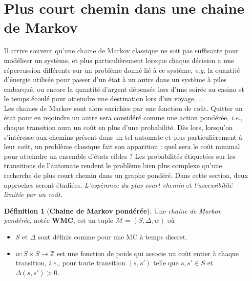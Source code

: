 \documentclass[12pt,a4paper]{report}
\theoremstyle{definition}
\newtheorem{definition}{Définition}[chapter]
\theoremstyle{remark}
\newcommand{\eg}{\textit{e.g.} }
\newcommand{\ie}{\textit{i.e.}, }
\let\labelitemi\labelitemii
\begin{document}
\section{Plus court chemin dans une chaine de Markov}
Il arrive souvent qu'une chaine de Markov classique ne soit pas suffisante pour modéliser un système, et plus particulièrement lorsque chaque décision a une répercussion différente sur un problème donné lié à ce système, \eg la quantité d'énergie utilisée pour passer d'un état à un autre dans un système à piles embarqué, ou encore la quantité d'argent dépensée lors d'une soirée au casino et le temps écoulé pour atteindre une destination lors d'un voyage, $\dots$ \\
Les chaines de Markov sont alors enrichies par une fonction de coût. Quitter un état pour en rejoindre un autre sera considéré comme une action pondérée, \ie chaque transition aura un coût en plus d'une probabilité. Dès lors, lorsqu'on s'intéresse aux chemins présent dans un tel automate et plus particulièrement à leur coût, un problème classique fait son apparition : quel sera le coût minimal pour atteindre un ensemble d'états cibles ? Les probabilités étiquetées sur les transitions de l'automate rendent le problème bien plus complexe qu'une recherche de plus court chemin dans un graphe pondéré. Dans cette section, deux approches seront étudiées. \textit{L'espérance du plus court chemin} et \textit{l'accessibilité limitée par un coût}.

\begin{definition}[\textbf{Chaine de Markov pondérée}]
	Une \textit{chaine de Markov pondérée}, notée \textbf{WMC}, est un tuple $\mathcal{M} = (S, \Delta, w)$ où
	\begin{itemize}
		\renewcommand{\labelitemi}{\tiny$\bullet$}
		\item $S$ et $\Delta$ sont définis comme pour une MC à temps discret.
		\item $w: S\times S \rightarrow \mathbb{Z}$ est une fonction de poids qui associe un coût entier à chaque  transition, \ie pour toute transition $(s, s')$ telle que $s, s' \in S$ et $\Delta(s, s') > 0$.
	\end{itemize}
\end{definition}
\end{document}
